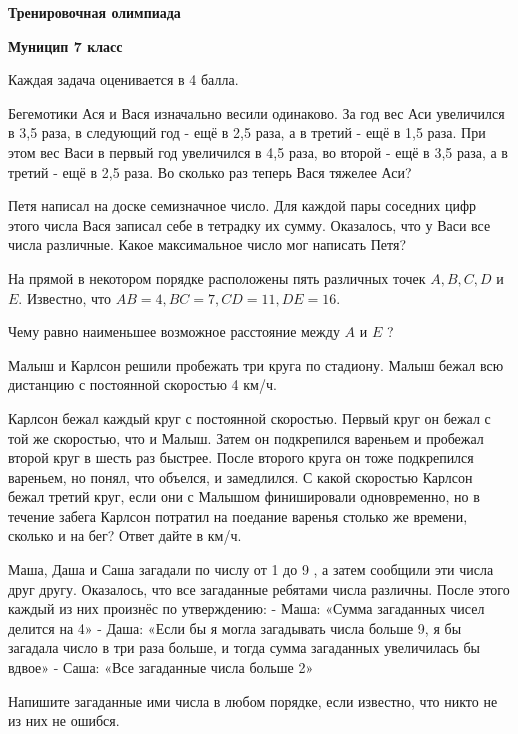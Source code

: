 \centerline{\bf \Huge Тренировочная олимпиада}
\centerline{\bf \Huge Муницип 7 класс}

\begin{flushright}
        \scriptsize{Каждая задача оценивается в 4 балла.}
\end{flushright}

 Бегемотики Ася и Вася изначально весили одинаково. За год вес Аси увеличился в 3,5 раза, в следующий год - ещё в 2,5 раза, а в третий - ещё в 1,5 раза. При этом вес Васи в первый год увеличился в 4,5 раза, во второй - ещё в 3,5 раза, а в третий - ещё в 2,5 раза. Во сколько раз теперь Вася тяжелее Аси?

 Петя написал на доске семизначное число. Для каждой пары соседних цифр этого числа Вася записал себе в тетрадку их сумму. Оказалось, что у Васи все числа различные. Какое максимальное число мог написать Петя?

 На прямой в некотором порядке расположены пять различных точек $A, B, C, D$ и $E$. Известно, что $A B=4, B C=7, C D=11, D E=16$.

Чему равно наименьшее возможное расстояние между $A$ и $E$ ?

 Малыш и Карлсон решили пробежать три круга по стадиону. Малыш бежал всю дистанцию с постоянной скоростью 4 км/ч.

Карлсон бежал каждый круг с постоянной скоростью. Первый круг он бежал с той же скоростью, что и Малыш. Затем он подкрепился вареньем и пробежал второй круг в шесть раз быстрее. После второго круга он тоже подкрепился вареньем, но понял, что объелся, и замедлился. С какой скоростью Карлсон бежал третий круг, если они с Малышом финишировали одновременно, но в течение забега Карлсон потратил на поедание варенья столько же времени, сколько и на бег? Ответ дайте в км/ч.

 Маша, Даша и Саша загадали по числу от 1 до 9 , а затем сообщили эти числа друг другу. Оказалось, что все загаданные ребятами числа различны. После этого каждый из них произнёс по утверждению:
- Маша: «Сумма загаданных чисел делится на 4»
- Даша: «Если бы я могла загадывать числа больше 9, я бы загадала число в три раза больше, и тогда сумма загаданных увеличилась бы вдвое»
- Саша: «Все загаданные числа больше 2»

Напишите загаданные ими числа в любом порядке, если известно, что никто не из них не ошибся.